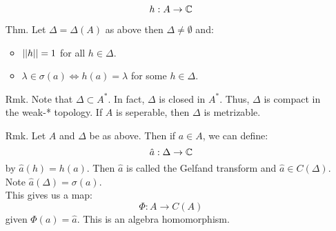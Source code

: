 \documentclass[12pt]{article}
\begin{document}
\begin{itemize}
    \[ h: A \to \mathbb C\]
    \item[Thm.] Let $\Delta = \Delta(A)$ as above then $\Delta \neq \emptyset$ and: 
    \begin{itemize}
        \item $\left\vert\left\vert h\right\vert\right\vert = 1$ for all $h \in \Delta$.
        \item $\lambda \in \sigma(a) \iff h(a) = \lambda$ for some $h \in \Delta$.
    \end{itemize}
    \item[Rmk.] Note that $\Delta \subset A^*$. In fact, $\Delta$ is closed in $A^*$. Thus, $\Delta$ is compact in the weak-* topology. If $A$ is seperable, then $\Delta$ is metrizable. 
    \item[Rmk.] Let $A$ and $\Delta$ be as above. Then if $a \in A$, we can define: 
    \[ \hat a: \Delta \to \mathbb C\]
    by $\hat a(h) = h(a)$. Then $\hat a$ is called the Gelfand transform and $\hat a \in C(\Delta)$. Note $\hat a(\Delta) = \sigma(a)$.\\
    This gives us a map: 
    \[ \Phi: A \to C(A)\]
    given $\Phi(a) = \hat a$. This is an algebra homomorphism.  
\end{itemize}
\end{document}
